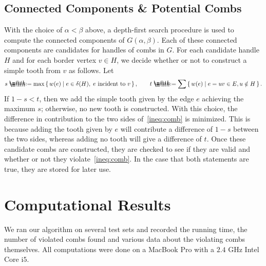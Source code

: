 \documentclass[11pt, letterpaper]{amsart}
\makeatletter
\theoremstyle{plain}
\theoremstyle{definition}
\theoremstyle{remark}
\newcommand*{\coloneqq}{\mathrel{\rlap{%
           \raisebox{0.3ex}{$\m@th\cdot$}}%
           \raisebox{-0.3ex}{$\m@th\cdot$}}%
           =}
\makeatother
\begin{document}
\subsection{Connected Components \& Potential Combs}
With the choice of $\alpha < \beta$ above, a depth-first search procedure is
used to compute the connected components of $G(\alpha,\beta)$. Each of these
connected components are candidates for handles of combs in $G$. For each
candidate handle $H$ and for each border vertex $v \in H$, we decide whether or
not to construct a simple tooth from $v$ as follows. Let
\begin{align*}
  s \coloneqq \max\set{w(e) | e \in \delta(H), \;\text{$e$ incident to $v$}}, \qquad t \coloneqq \sum \set{w(e) | e = uv \in E, u \notin H}.
\end{align*}
If $1 - s < t$, then we add the simple tooth given by the edge $e$ achieving
the maximum $s$; otherwise, no new tooth is constructed. With this choice, the
difference in contribution to the two sides of~\eqref{ineq:comb} is minimized.
This is because adding the tooth given by $e$ will contribute a difference of
$1 - s$ between the two sides, whereas adding no tooth will give a difference
of $t$. Once these candidate combs are constructed, they are checked to see if
they are valid and whether or not they violate~\eqref{ineq:comb}. In the case that
both statements are true, they are stored for later use.

\section{Computational Results}\label{sec:computations}
We ran our algorithm on several test sets and recorded the running time, the
number of violated combs found and various data about the violating combs
themselves. All computations were done on a MacBook Pro with a $2.4$ GHz Intel
Core i$5$.
\end{document}
